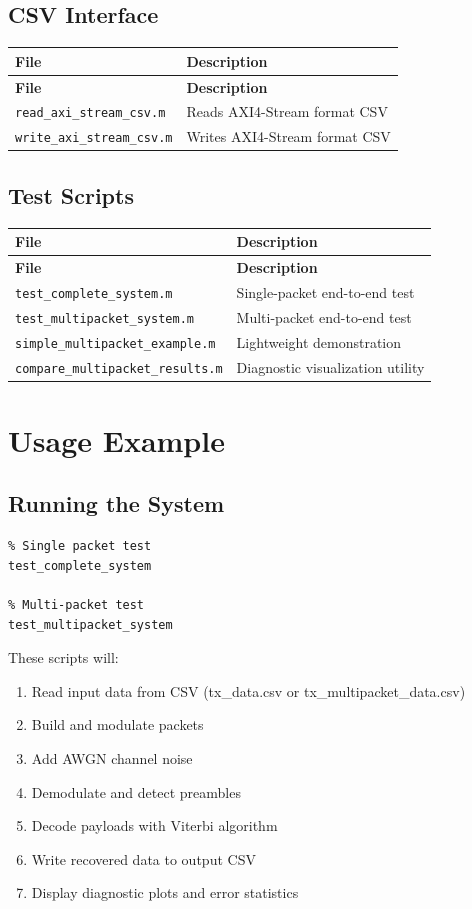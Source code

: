 \documentclass[12pt]{article}
\begin{document}
\subsection{CSV Interface}
\begin{longtable}{|p{4cm}|p{10cm}|}
\hline
\textbf{File} & \textbf{Description} \\
\hline
\endfirsthead
\hline
\textbf{File} & \textbf{Description} \\
\hline
\endhead
\hline
\endfoot
\hline
\texttt{read\_axi\_stream\_csv.m} & Reads AXI4-Stream format CSV \\
\hline
\texttt{write\_axi\_stream\_csv.m} & Writes AXI4-Stream format CSV \\
\hline
\end{longtable}

\subsection{Test Scripts}
\begin{longtable}{|p{4cm}|p{10cm}|}
\hline
\textbf{File} & \textbf{Description} \\
\hline
\endfirsthead
\hline
\textbf{File} & \textbf{Description} \\
\hline
\endhead
\hline
\endfoot
\hline
\texttt{test\_complete\_system.m} & Single-packet end-to-end test \\
\hline
\texttt{test\_multipacket\_system.m} & Multi-packet end-to-end test \\
\hline
\texttt{simple\_multipacket\_example.m} & Lightweight demonstration \\
\hline
\texttt{compare\_multipacket\_results.m} & Diagnostic visualization utility \\
\hline
\end{longtable}

\section{Usage Example}

\subsection{Running the System}
\begin{verbatim}
% Single packet test
test_complete_system

% Multi-packet test
test_multipacket_system
\end{verbatim}

These scripts will:
\begin{enumerate}
    \item Read input data from CSV (tx\_data.csv or tx\_multipacket\_data.csv)
    \item Build and modulate packets
    \item Add AWGN channel noise
    \item Demodulate and detect preambles
    \item Decode payloads with Viterbi algorithm
    \item Write recovered data to output CSV
    \item Display diagnostic plots and error statistics
\end{enumerate}
\end{document}

